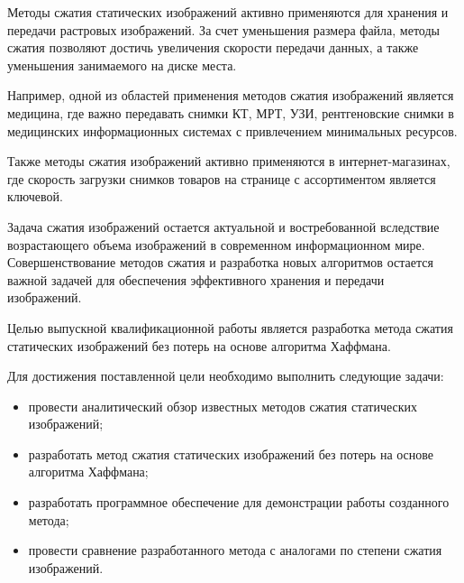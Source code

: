 \maketableofcontents

\intro

Методы сжатия статических изображений активно применяются для хранения и передачи растровых изображений. За счет уменьшения размера файла, методы сжатия позволяют достичь увеличения скорости передачи данных, а также уменьшения занимаемого на диске места.

Например, одной из областей применения методов сжатия изображений является медицина, где важно передавать снимки КТ, МРТ, УЗИ, рентгеновские снимки в медицинских информационных системах с привлечением минимальных ресурсов.

Также методы сжатия изображений активно применяются в интернет-магазинах, где скорость загрузки снимков товаров на странице с ассортиментом является ключевой.

Задача сжатия изображений остается актуальной и востребованной вследствие возрастающего объема изображений в современном информационном мире. Совершенствование методов сжатия и разработка новых алгоритмов остается важной задачей для обеспечения эффективного хранения и передачи изображений.

Целью выпускной квалификационной работы является разработка метода сжатия статических изображений без потерь на основе алгоритма Хаффмана.

Для достижения поставленной цели необходимо выполнить следующие задачи:

\begin{itemize}
    \item провести аналитический обзор известных методов сжатия статических изображений;
    \item разработать метод сжатия статических изображений без потерь на основе алгоритма Хаффмана;
    \item разработать программное обеспечение для демонстрации работы созданного метода;
    \item провести сравнение разработанного метода с аналогами по степени сжатия изображений.
\end{itemize}
